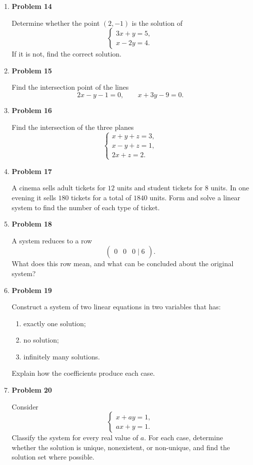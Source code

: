 \begin{enumerate}
\item \textbf{Problem 14}\par
Determine whether the point \((2,-1)\) is the solution of
\[
\begin{cases}
3x+y=5,\\
x-2y=4.
\end{cases}
\]
If it is not, find the correct solution.

\item \textbf{Problem 15}\par
Find the intersection point of the lines
\[
2x-y-1=0,
\qquad
x+3y-9=0.
\]

\item \textbf{Problem 16}\par
Find the intersection of the three planes
\[
\begin{cases}
x+y+z=3,\\
x-y+z=1,\\
2x+z=2.
\end{cases}
\]

\item \textbf{Problem 17}\par
A cinema sells adult tickets for \(12\) units and student tickets for \(8\) units. In one evening it sells \(180\) tickets for a total of \(1840\) units. Form and solve a linear system to find the number of each type of ticket.

\item \textbf{Problem 18}\par
A system reduces to a row
\[
\begin{pmatrix}0&0&0\mid 6\end{pmatrix}.
\]
What does this row mean, and what can be concluded about the original system?

\item \textbf{Problem 19}\par
Construct a system of two linear equations in two variables that has:
\begin{enumerate}
\item exactly one solution;
\item no solution;
\item infinitely many solutions.
\end{enumerate}
Explain how the coefficients produce each case.

\item \textbf{Problem 20}\par
Consider
\[
\begin{cases}
x+ay=1,\\
ax+y=1.
\end{cases}
\]
Classify the system for every real value of \(a\). For each case, determine whether the solution is unique, nonexistent, or non-unique, and find the solution set where possible.
\end{enumerate}
